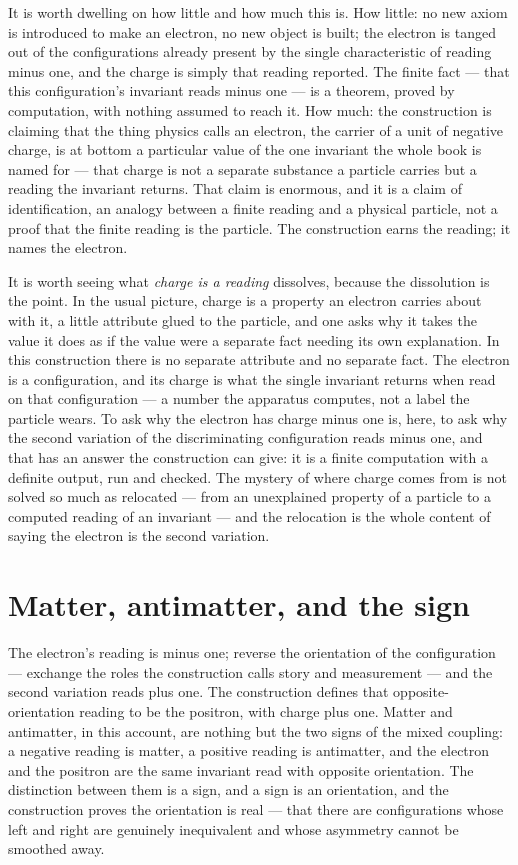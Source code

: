 It is worth dwelling on how little and how much this is. How little: no new axiom is introduced to make
an electron, no new object is built; the electron is tanged out of the configurations already present
by the single characteristic of reading minus one, and the charge is simply that reading reported. The
finite fact --- that this configuration's invariant reads minus one --- is a theorem, proved by
computation, with nothing assumed to reach it. How much: the construction is claiming that the thing
physics calls an electron, the carrier of a unit of negative charge, is at bottom a particular value of
the one invariant the whole book is named for --- that charge is not a separate substance a particle
carries but a reading the invariant returns. That claim is enormous, and it is a claim of
identification, an analogy between a finite reading and a physical particle, not a proof that the
finite reading is the particle. The construction earns the reading; it names the electron.

It is worth seeing what \emph{charge is a reading} dissolves, because the dissolution is the point. In
the usual picture, charge is a property an electron carries about with it, a little attribute glued to
the particle, and one asks why it takes the value it does as if the value were a separate fact needing
its own explanation. In this construction there is no separate attribute and no separate fact. The
electron is a configuration, and its charge is what the single invariant returns when read on that
configuration --- a number the apparatus computes, not a label the particle wears. To ask why the
electron has charge minus one is, here, to ask why the second variation of the discriminating
configuration reads minus one, and that has an answer the construction can give: it is a finite
computation with a definite output, run and checked. The mystery of where charge comes from is not
solved so much as relocated --- from an unexplained property of a particle to a computed reading of an
invariant --- and the relocation is the whole content of saying the electron is the second variation.

\section{Matter, antimatter, and the sign}
\label{se:matter-antimatter-and-the-sign}

The electron's reading is minus one; reverse the orientation of the configuration --- exchange the roles
the construction calls story and measurement --- and the second variation reads plus one. The
construction defines that opposite-orientation reading to be the positron, with charge plus one. Matter
and antimatter, in this account, are nothing but the two signs of the mixed coupling: a negative reading
is matter, a positive reading is antimatter, and the electron and the positron are the same invariant
read with opposite orientation. The distinction between them is a sign, and a sign is an orientation,
and the construction proves the orientation is real --- that there are configurations whose left and
right are genuinely inequivalent and whose asymmetry cannot be smoothed away.

